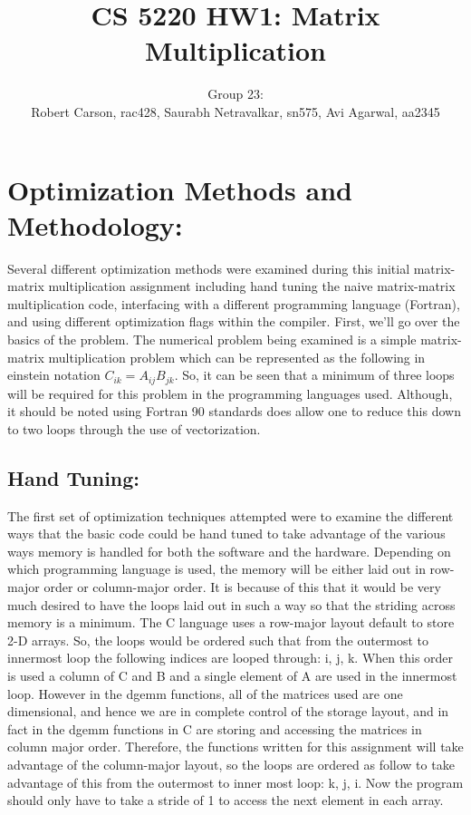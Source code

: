 \documentclass{article}
\begin{document}
\title{CS 5220 HW1: Matrix Multiplication}
\author{Group 23: \\Robert Carson, rac428, Saurabh Netravalkar, sn575, Avi Agarwal, aa2345}
\renewcommand{\today}{17 Sept. 2015}
\maketitle

\section*{Optimization Methods and Methodology:} 

Several different optimization methods were examined during this initial matrix-matrix multiplication assignment including hand tuning the naive matrix-matrix multiplication code, interfacing with a different programming language (Fortran), and using different optimization flags within the compiler.  First, we'll go over the basics of the problem. The numerical problem being examined is a simple matrix-matrix multiplication problem which can be represented as the following in einstein notation  $C_{ik} = A_{ij}B_{jk}$. 
So, it can be seen that a minimum of three loops will be required for this problem in the programming languages used. Although, it should be noted using Fortran 90 standards does allow one to reduce this down to two loops through the use of vectorization. 

\subsection*{Hand Tuning:}

The first set of optimization techniques attempted were to examine the different ways that the basic code could be hand tuned to take advantage of the various ways memory is handled for both the software and the hardware.  Depending on which programming language is used, the memory will be either laid out in row-major order or column-major order. It is because of this that it would be very much desired to have the loops laid out in such a way so that the striding across memory is a minimum. The C language uses a row-major layout default to store 2-D arrays.  So, the loops would be ordered such that from the outermost to innermost loop the following indices are looped through: i, j, k. When this order is used a column of C and B and a single element of A are used in the innermost loop. However in the dgemm functions, all of the matrices used are one dimensional, and hence we are in complete control of the storage layout, and in fact in the dgemm functions in C are storing and accessing the matrices in column major order.  Therefore, the functions written for this assignment will take advantage of the column-major layout, so the loops are ordered as follow to take advantage of this from the outermost to inner most loop: k, j, i. Now the program should only have to take a stride of 1 to access the next element in each array.
\end{document}
